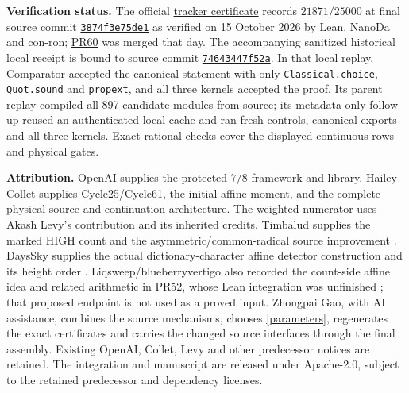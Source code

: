 \documentclass[10pt,a4paper]{article}
\begin{document}
\textbf{Verification status.}
The official \href{https://gtimg.github.io/QuasiRiemannTracker/certificates/gao-affine-asymmetric-20261015.json}{tracker certificate}
records $21871/25000$ at final source commit
\href{https://github.com/GTimG/QuasiRiemannTracker/blob/3874f3e75de18ff5806dcb9519fc260e034ef0e9/submissions/gao-affine-asymmetric-20261015/src/Candidate/Main.lean}{\texttt{3874f3e75de1}}
as verified on 15 October 2026 by Lean, NanoDa and con-ron;
\href{https://github.com/GTimG/QuasiRiemannTracker/pull/60}{PR60} was merged that day.
The accompanying sanitized historical local receipt is bound to source
commit \href{https://github.com/Gaozhongpai/QuasiRiemannTracker/blob/74643447f52a2df4d05cbb23f50b9e6f2959beaa/submissions/gao-affine-asymmetric-20261015/src/Candidate/Main.lean}{\texttt{74643447f52a}}.
In that local replay, Comparator accepted the canonical statement with only
\texttt{Classical.choice}, \texttt{Quot.sound} and \texttt{propext}, and all
three kernels accepted the proof. Its parent replay compiled all 897
candidate modules from source; its metadata-only follow-up reused an
authenticated local cache and ran fresh controls, canonical exports and
all three kernels. Exact rational checks cover the displayed continuous
rows and physical gates.

\textbf{Attribution.}
OpenAI supplies the protected $7/8$ framework and library. Hailey Collet
supplies Cycle25/Cycle61, the initial affine moment, and the complete
physical source and continuation architecture. The weighted numerator
uses Akash Levy's contribution and its inherited credits.
Timbalud supplies the marked HIGH count and the asymmetric/common-radical
source improvement \cite{asymmetric}. DaysSky supplies the actual
dictionary-character affine detector construction and its height order
\cite{detector}. Liqsweep/blueberryvertigo also recorded the count-side
affine idea and related arithmetic in PR52, whose Lean integration was
unfinished \cite{related}; that proposed endpoint is not used as a proved
input. Zhongpai Gao, with AI assistance, combines the source mechanisms,
chooses \eqref{parameters}, regenerates the exact certificates and carries
the changed source interfaces through the final assembly. Existing
OpenAI, Collet, Levy and other predecessor notices are retained. The
integration and manuscript are released under Apache-2.0, subject to the
retained predecessor and dependency licenses.
\end{document}
